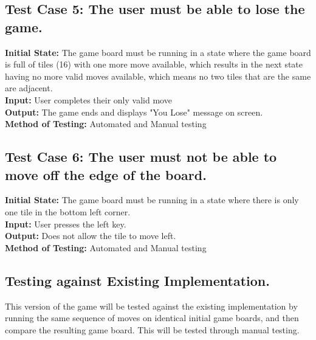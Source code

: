 \documentclass[12pt]{article}
\begin{document}
\subsection{Test Case 5: The user must be able to lose the game.}

\textbf{Initial State:} The game board must be running in a state where the game board
is full of tiles (16) with one more move available, which results in the next
state having no more valid moves available, which means no two tiles that are
the same are adjacent.\\
\textbf{Input:} User completes their only valid move\\
\textbf{Output:} The game ends and displays "You Lose" message on screen.\\
\textbf{Method of Testing:} Automated and Manual testing

\subsection{Test Case 6: The user must not be able to move off the edge of the board.}

\textbf{Initial State:} The game board must be running in a state where there is only one tile in the bottom left corner.\\
\textbf{Input:} User presses the left key.\\
\textbf{Output:} Does not allow the tile to move left.\\
\textbf{Method of Testing:} Automated and Manual testing

\subsection{Testing against Existing Implementation.}
This version of the game will be tested against the existing implementation by running the same sequence of moves on identical initial game boards, and then compare the resulting game board. This will be tested through manual testing. 



\end{document}

